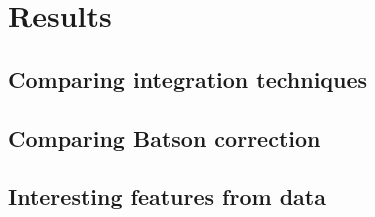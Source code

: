 \section{Results}
\subsection{Comparing integration techniques}
\subsection{Comparing Batson correction}
\subsection{Interesting features from data}